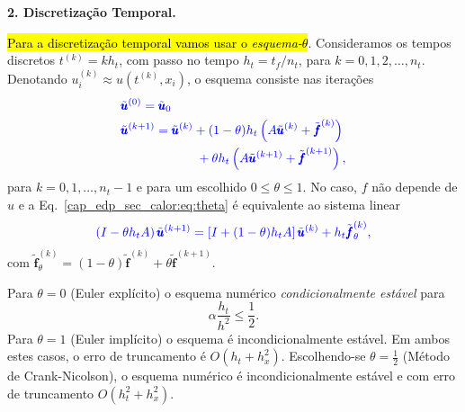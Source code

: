 \begin{flushleft}
  \textbf{2. Discretização Temporal.}
\end{flushleft}

\hl{Para a discretização temporal vamos usar o \emph{esquema-$\theta$}}. Consideramos os tempos discretos $t^{(k)} = kh_t$, com passo no tempo $h_t = t_f/n_t$, para $k = 0, 1, 2, \dotsc, n_t$. Denotando $u^{(k)}_i \approx u\left(t^{(k)}, x_i\right)$, o esquema consiste nas iterações
\begin{subequations}\hleq
  \begin{align}
    &\tilde{\pmb{u}}^{(0)} = \tilde{\pmb{u}}_0\\
    &\tilde{\pmb{u}}^{(k+1)} = \tilde{\pmb{u}}^{(k)} + (1-\theta)h_t\left(A\tilde{\pmb{u}}^{(k)}+\tilde{\pmb{f}}^{(k)}\right)\nonumber\\
    &\qquad\qquad\qquad + \theta h_t\left(A\tilde{\pmb{u}}^{(k+1)}+\tilde{\pmb{f}}^{(k+1)}\right),\label{cap_edp_sec_calor:eq:theta}
  \end{align}
\end{subequations}
para $k = 0, 1, \dotsc, n_t-1$ e para um escolhido $0 \leq \theta \leq 1$. No caso, $f$ não depende de $u$ e a Eq.~\eqref{cap_edp_sec_calor:eq:theta} é equivalente ao sistema linear
\begin{equation}\color{blue}\left(I - \theta h_t A\right)\tilde{\pmb{u}}^{(k+1)} = \left[I + (1-\theta)h_tA\right]\tilde{\pmb{u}}^{(k)} + h_t\tilde{\pmb{f}}_\theta^{(k)},
\end{equation}
com $\tilde{\pmb{f}}_\theta^{(k)} = (1-\theta)\tilde{\pmb{f}}^{(k)} + \theta\tilde{\pmb{f}}^{(k+1)}$.

\begin{obs}
  Para $\theta = 0$ (Euler explícito) o esquema numérico \emph{condicionalmente estável} \cite[Cap. 12, Seç. 2]{Burden2015a} para
  \begin{equation}
    \alpha\frac{h_t}{h^2}\leq \frac{1}{2}.
  \end{equation}
  Para $\theta = 1$ (Euler implícito) o esquema é incondicionalmente estável. Em ambos estes casos, o erro de truncamento é $O(h_t + h_x^2)$. Escolhendo-se $\theta=\frac{1}{2}$ (Método de Crank-Nicolson), o esquema numérico é incondicionalmente estável e com erro de truncamento $O(h_t^2 + h_x^2)$. 
\end{obs}

